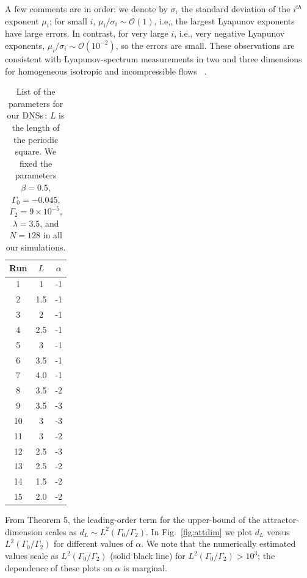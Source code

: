 \documentclass[11pt]{amsart}
\newcommand{\Gamzero}{\Gamma_{0}}
\newcommand{\Gamtwo}{\Gamma_{2}}
\theoremstyle{definition}
\numberwithin{equation}{section}
\numberwithin{equation}{section}
\begin{document}
A few comments are in order: we denote by $\sigma_{i}$ the standard deviation of the $i^{th}$ exponent $\mu_{i}$; for small $i$, $\mu_{i}/\sigma_{i}\sim \mathcal{O}(1)$, i.e,, the largest Lyapunov exponents have large errors. In contrast, for very large $i$, i.e., very negative Lyapunov exponents, $\mu_{i}/\sigma_{i} \sim \mathcal{O}(10^{-2})$, so the errors are small. These observations are consistent with Lyapunov-spectrum measurements in two and three dimensions for homogeneous isotropic and incompressible flows ~\cite{HR2019PRF,BC2019PRE,CTB2020PRF}.  
\begin{table}[!h]
		\centering
		\begin{tabular}{|c|c| c|}
			\hline
			Run & $L$ &  $\alpha$ 
			\\
			\hline
			1& 1& -1\\
			\hline
			2& 1.5& -1\\
			\hline
			3& 2& -1\\
            \hline
			4& 2.5& -1\\
			\hline
			5& 3& -1\\
            \hline
			6& 3.5& -1\\
            \hline
			7& 4.0& -1\\
			\hline
			8& 3.5& -2\\
			\hline
			9& 3.5& -3\\
			\hline
			10& 3& -3\\
			\hline
			11& 3& -2\\
			\hline
			12& 2.5& -3\\
			\hline
			13& 2.5& -2\\
			\hline
			14& 1.5& -2\\
			\hline
			15& 2.0& -2\\
			\hline
		\end{tabular}
        \medskip
        \caption{\footnotesize List of the parameters for our DNSs\,: $L$ is the length of the periodic square. We fixed the parameters $\beta=0.5$, $\Gamma_0=-0.045$, $\Gamma_2=9\times10^{-5}$, $\lambda=3.5$, and $N=128$ in all our simulations.
        }\label{tab:table_DNS}
\end{table}
\par\vspace{0mm}\noindent
From Theorem 5, the leading-order term for the upper-bound of the attractor-dimension scales as $d_L\sim L^2(\Gamzero/\Gamtwo)$. In Fig.~\ref{fig:attdim} we plot $d_{L}$ versus $L^2(\Gamzero/\Gamtwo)$ for different values of $\alpha$. We note that the numerically estimated values scale as $L^2(\Gamzero/\Gamtwo)$ (solid black line) for $L^2(\Gamzero/\Gamtwo)>10^3$; the dependence of these plots on $\alpha$ is marginal. 
\end{document}
